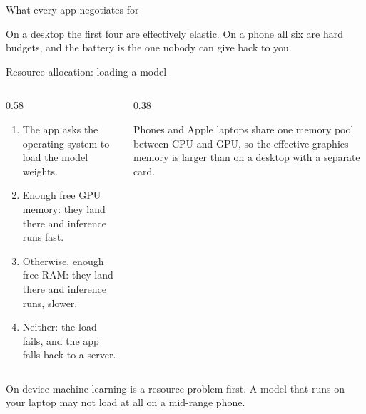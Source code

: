 \documentclass[10pt,aspectratio=169,t]{beamer}
\begin{document}
\begin{frame}[eyebrow=Device spectrum]{What every app negotiates for}
  \vskip 1mm
  \begin{grid}[3]
  \end{grid}
  \begin{takeaway}{On a desktop the first four are effectively elastic.}
    On a phone all six are hard budgets, and the battery is the one nobody can give back to you.
  \end{takeaway}
\end{frame}

\begin{frame}[eyebrow=Device spectrum]{Resource allocation: loading a model}
  \vskip 2mm
  \begin{columns}[T]
    \begin{column}{0.58\textwidth}
      \begin{enumerate}
        \item The app asks the operating system to load the model weights.
        \item Enough free GPU memory: they land there and inference runs fast.
        \item Otherwise, enough free RAM: they land there and inference runs, slower.
        \item Neither: the load fails, and the app falls back to a server.
      \end{enumerate}
    \end{column}
    \begin{column}{0.38\textwidth}
      \begin{hint}
        Phones and Apple laptops share one memory pool between CPU and GPU, so the effective graphics memory is larger than on a desktop with a separate card.
      \end{hint}
    \end{column}
  \end{columns}
  \begin{takeaway}{On-device machine learning is a resource problem first.}
    A model that runs on your laptop may not load at all on a mid-range phone.
  \end{takeaway}
\end{frame}
\end{document}
